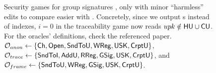 \begin{figure}[ht!]
  \centering
  \caption{Security games for group signatures \cite{bsz05}, only with minor    
    ``harmless'' edits to compare easier with \CUASGS. Concretely, since we
    output {\upk}s instead of indexes, $i=0$ in the traceability game now reads
    $upk \notin \mathsf{HU} \cup \mathsf{CU}$. For the oracles' definitions, check the
    referenced paper.
    $\mathcal{O}_{anon} \gets \lbrace \mathsf{Ch},\mathsf{Open},\mathsf{SndToU},
    \mathsf{WReg},\mathsf{USK},\mathsf{CrptU} \rbrace$,
    $\mathcal{O}_{trace} \gets \lbrace \mathsf{SndToI},\mathsf{AddU},
    \mathsf{RReg},\mathsf{GSig},\mathsf{USK},\mathsf{CrptU} \rbrace$,
    and $\mathcal{O}_{frame} \gets \lbrace \mathsf{SndToU},\mathsf{WReg},
    \mathsf{GSig},\mathsf{USK},\mathsf{CrptU} \rbrace$.
  }
  \label{fig:model-gs}  
\end{figure}

